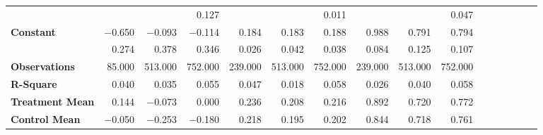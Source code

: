 \begin{tabular}{@{\extracolsep{5pt}}lrrrrrrrrrrrrrrr}
{\bf } & \phantom{***} & \phantom{***} & 0.127\phantom{\phantom{)}***} & \phantom{***} & \phantom{***} & 0.011\phantom{\phantom{)}***} & \phantom{***} & \phantom{***} & 0.047\phantom{\phantom{)}***} \\
{\bf Constant} & $-$0.650\phantom{\phantom{)}***} & $-$0.093\phantom{\phantom{)}***} & $-$0.114\phantom{\phantom{)}***} & 0.184\phantom{\phantom{)}***} & 0.183\phantom{\phantom{)}***} & 0.188\phantom{\phantom{)}***} & 0.988\phantom{\phantom{)}***} & 0.791\phantom{\phantom{)}***} & 0.794\phantom{\phantom{)}***} \\
{\bf } & 0.274\phantom{\phantom{)}***} & 0.378\phantom{\phantom{)}***} & 0.346\phantom{\phantom{)}***} & 0.026\phantom{\phantom{)}***} & 0.042\phantom{\phantom{)}***} & 0.038\phantom{\phantom{)}***} & 0.084\phantom{\phantom{)}***} & 0.125\phantom{\phantom{)}***} & 0.107\phantom{\phantom{)}***} \\
{\bf Observations} & 85.000\phantom{\phantom{)}***} & 513.000\phantom{\phantom{)}***} & 752.000\phantom{\phantom{)}***} & 239.000\phantom{\phantom{)}***} & 513.000\phantom{\phantom{)}***} & 752.000\phantom{\phantom{)}***} & 239.000\phantom{\phantom{)}***} & 513.000\phantom{\phantom{)}***} & 752.000\phantom{\phantom{)}***} \\
{\bf R-Square} & 0.040\phantom{***} & 0.035\phantom{***} & 0.055\phantom{***} & 0.047\phantom{***} & 0.018\phantom{***} & 0.058\phantom{***} & 0.026\phantom{***} & 0.040\phantom{***} & 0.058\phantom{***} \\
{\bf Treatment Mean} & 0.144\phantom{***} & $-$0.073\phantom{***} & 0.000\phantom{***} & 0.236\phantom{***} & 0.208\phantom{***} & 0.216\phantom{***} & 0.892\phantom{***} & 0.720\phantom{***} & 0.772\phantom{***} \\
{\bf Control Mean} & $-$0.050\phantom{***} & $-$0.253\phantom{***} & $-$0.180\phantom{***} & 0.218\phantom{***} & 0.195\phantom{***} & 0.202\phantom{***} & 0.844\phantom{***} & 0.718\phantom{***} & 0.761\phantom{***} \\
\hline
\end{tabular}
